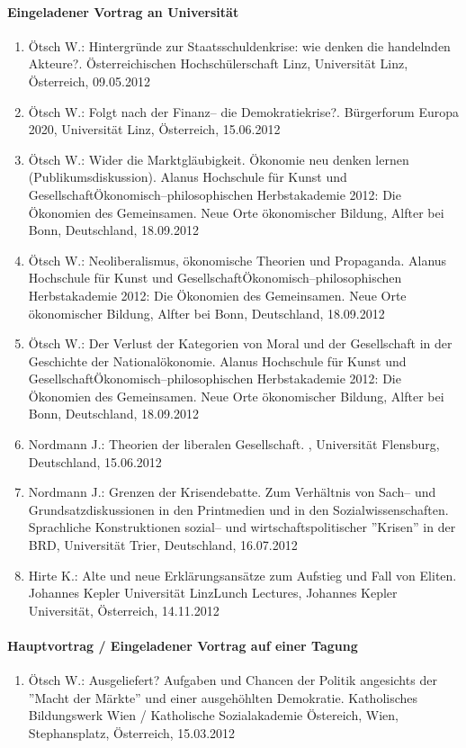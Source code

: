 \paragraph{Eingeladener Vortrag an Universität}
\begin{enumerate}
	\item Ötsch W.: Hintergründe zur Staatsschuldenkrise: wie denken die handelnden Akteure?. Österreichischen Hochschülerschaft Linz, Universität Linz, Österreich, 09.05.2012
	\item Ötsch W.: Folgt nach der Finanz-- die Demokratiekrise?. Bürgerforum Europa 2020, Universität Linz, Österreich, 15.06.2012
	\item Ötsch W.: Wider die Marktgläubigkeit. Ökonomie neu denken lernen (Publikumsdiskussion). Alanus Hochschule für Kunst und GesellschaftÖkonomisch--philosophischen Herbstakademie 2012: Die Ökonomien des Gemeinsamen. Neue Orte ökonomischer Bildung, Alfter bei Bonn, Deutschland, 18.09.2012
	\item Ötsch W.: Neoliberalismus, ökonomische Theorien und Propaganda. Alanus Hochschule für Kunst und GesellschaftÖkonomisch--philosophischen Herbstakademie 2012: Die Ökonomien des Gemeinsamen. Neue Orte ökonomischer Bildung, Alfter bei Bonn, Deutschland, 18.09.2012
	\item Ötsch W.: Der Verlust der Kategorien von Moral und der Gesellschaft in der Geschichte der Nationalökonomie. Alanus Hochschule für Kunst und GesellschaftÖkonomisch--philosophischen Herbstakademie 2012: Die Ökonomien des Gemeinsamen. Neue Orte ökonomischer Bildung, Alfter bei Bonn, Deutschland, 18.09.2012
	\item Nordmann J.: Theorien der liberalen Gesellschaft. , Universität Flensburg, Deutschland, 15.06.2012
	\item Nordmann J.: Grenzen der Krisendebatte. Zum Verhältnis von Sach-- und Grundsatzdiskussionen in den Printmedien und in den Sozialwissenschaften. Sprachliche Konstruktionen sozial-- und wirtschaftspolitischer ''Krisen'' in der BRD, Universität Trier, Deutschland, 16.07.2012
	\item Hirte K.: Alte und neue Erklärungsansätze zum Aufstieg und Fall von Eliten. Johannes Kepler Universität LinzLunch Lectures, Johannes Kepler Universität, Österreich, 14.11.2012
\end{enumerate}
\paragraph{Hauptvortrag / Eingeladener Vortrag auf einer Tagung}
\begin{enumerate}
	\item Ötsch W.: Ausgeliefert? Aufgaben und Chancen der Politik angesichts der ''Macht der Märkte'' und einer ausgehöhlten Demokratie. Katholisches Bildungswerk Wien / Katholische Sozialakademie Östereich, Wien, Stephansplatz, Österreich, 15.03.2012
\end{enumerate}
